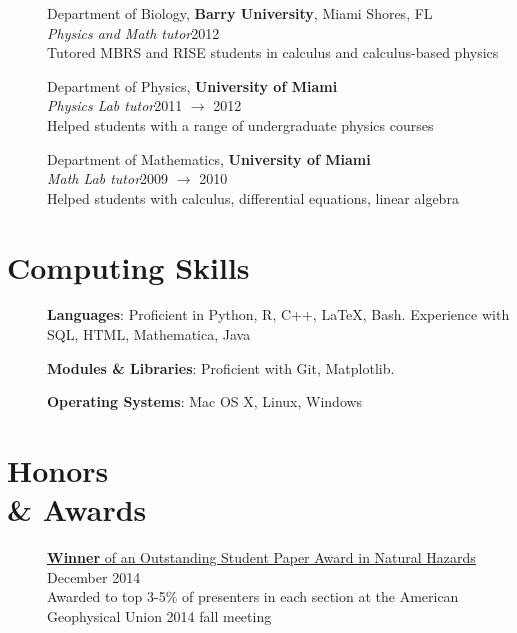 \documentclass[margin,line]{resume}
\begin{document}
\begin{resume}
\begin{description}
    \item[] \normalsize Department of Biology, \textbf{Barry University}, Miami Shores, FL \\
    \emph{Physics and Math tutor}\hfill 2012 \\
    Tutored MBRS and RISE students in calculus and calculus-based physics

    \item[] \normalsize Department of Physics, \textbf{University of Miami} \\
    \emph{Physics Lab tutor}\hfill 2011 $\rightarrow$ 2012 \\
    Helped students with a range of undergraduate physics courses

    \item[] \normalsize Department of Mathematics, \textbf{University of Miami} \\
    \emph{Math Lab tutor}\hfill 2009 $\rightarrow$ 2010 \\
    Helped students with calculus, differential equations, linear algebra

\end{description}




\section{\mysidestyle \textbf{Computing Skills}}
\begin{description}
    \item[] \textbf{Languages}: Proficient in  Python, \textsf{R}, C++, \LaTeX, Bash. Experience with SQL, HTML, Mathematica, Java 
    \item[] \textbf{Modules \& Libraries}: Proficient with Git, Matplotlib. 
    \item[] \textbf{Operating Systems}: Mac OS X, Linux, Windows 

\end{description}   



\section{\mysidestyle \textbf{Honors} \\ \textbf{\&} \textbf{Awards}}\vspace{1mm}
\begin{description}   
    \item[] \normalsize \href{http://ospa.agu.org/ospa/2014-fall-meeting-ospa-winners/}{\textbf{Winner} of an Outstanding Student Paper Award in Natural Hazards} \hfill December 2014 \\
    \small Awarded to top 3-5\% of presenters in each section at the American Geophysical Union 2014 fall meeting


\end{description}
\end{resume}
\end{document}
